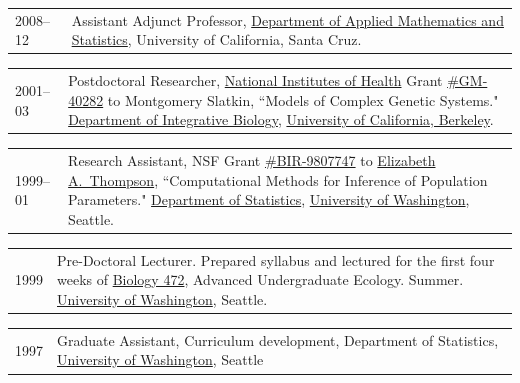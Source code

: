 \documentclass[11pt]{article}
\newlength{\myindent}
\newlength{\scndcol}
\begin{document}
\begin{tabular}{ @{}p{2.5\myindent} p{\scndcol}@{}  }
\hspace*{\myindent}2008--12 & Assistant Adjunct  Professor, \href{http://www.ams.ucsc.edu/}{Department of Applied Mathematics and Statistics}, University of California, Santa Cruz.
\\
\end{tabular}


\begin{tabular}{ @{}p{2.5\myindent} p{\scndcol}@{}  }
\hspace*{\myindent}2001--03 &  Postdoctoral Researcher, \href{http://www.nih.gov/}{National Institutes of Health} Grant
\href{http://crisp.cit.nih.gov/crisp/CRISP_LIB.getdoc?textkey=6646473\&p_grant_num=5R01GM040282-16\&p_query=\&ticket=8287715\&p_audit_session_id=37483287\&p_keywords=}{\#GM-40282} to Montgomery Slatkin, ``Models of Complex Genetic Systems." \href{http://ib.berkeley.edu/}{Department of 
Integrative Biology}, \href{http://www.berkeley.edu/}{University of California, Berkeley}. 
\end{tabular}

\begin{tabular}{ @{}p{2.5\myindent} p{\scndcol}@{}  }
\hspace*{\myindent}1999--01 &  Research Assistant, NSF Grant \href{http://www.fastlane.nsf.gov/servlet/showaward?award=9807747}{\#BIR-9807747} to
\href{http://www.stat.washington.edu/thompson/}{Elizabeth A.~Thompson}, ``Computational Methods for Inference of Population
Parameters." \href{http://www.stat.washington.edu/}{Department of Statistics}, \href{http://www.washington.edu/}{University of Washington}, Seattle. 
\end{tabular}

\begin{tabular}{ @{}p{2.5\myindent} p{\scndcol}@{}  }
\hspace*{\myindent}1999 &  Pre-Doctoral Lecturer. Prepared syllabus and lectured
for the first four weeks of \href{http://www.washington.edu/students/crscat/biology.html}{Biology 472}, Advanced Undergraduate Ecology.  Summer.  
\href{http://www.washington.edu/}{University of Washington}, Seattle.
\end{tabular}

\begin{tabular}{ @{}p{2.5\myindent} p{\scndcol}@{}  }
\hspace*{\myindent}1997 & Graduate Assistant, Curriculum development,
Department of Statistics, \href{http://www.washington.edu/}{University of Washington}, Seattle\end{tabular}
\end{document}
